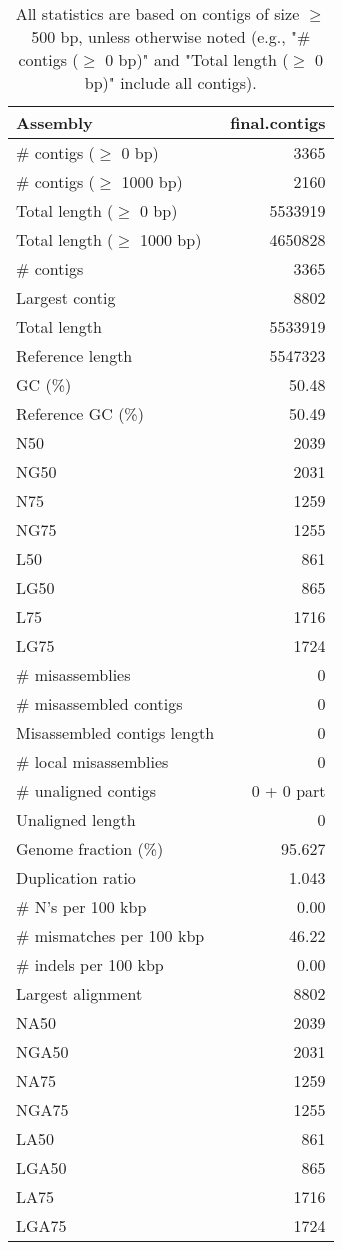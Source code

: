 \documentclass[12pt,a4paper]{article}
\begin{document}
\begin{table}[ht]
\begin{center}
\caption{All statistics are based on contigs of size $\geq$ 500 bp, unless otherwise noted (e.g., "\# contigs ($\geq$ 0 bp)" and "Total length ($\geq$ 0 bp)" include all contigs).}
\begin{tabular}{|l*{1}{|r}|}
\hline
Assembly & final.contigs \\ \hline
\# contigs ($\geq$ 0 bp) & 3365 \\ \hline
\# contigs ($\geq$ 1000 bp) & 2160 \\ \hline
Total length ($\geq$ 0 bp) & 5533919 \\ \hline
Total length ($\geq$ 1000 bp) & 4650828 \\ \hline
\# contigs & 3365 \\ \hline
Largest contig & 8802 \\ \hline
Total length & 5533919 \\ \hline
Reference length & 5547323 \\ \hline
GC (\%) & 50.48 \\ \hline
Reference GC (\%) & 50.49 \\ \hline
N50 & 2039 \\ \hline
NG50 & 2031 \\ \hline
N75 & 1259 \\ \hline
NG75 & 1255 \\ \hline
L50 & 861 \\ \hline
LG50 & 865 \\ \hline
L75 & 1716 \\ \hline
LG75 & 1724 \\ \hline
\# misassemblies & 0 \\ \hline
\# misassembled contigs & 0 \\ \hline
Misassembled contigs length & 0 \\ \hline
\# local misassemblies & 0 \\ \hline
\# unaligned contigs & 0 + 0 part \\ \hline
Unaligned length & 0 \\ \hline
Genome fraction (\%) & 95.627 \\ \hline
Duplication ratio & 1.043 \\ \hline
\# N's per 100 kbp & 0.00 \\ \hline
\# mismatches per 100 kbp & 46.22 \\ \hline
\# indels per 100 kbp & 0.00 \\ \hline
Largest alignment & 8802 \\ \hline
NA50 & 2039 \\ \hline
NGA50 & 2031 \\ \hline
NA75 & 1259 \\ \hline
NGA75 & 1255 \\ \hline
LA50 & 861 \\ \hline
LGA50 & 865 \\ \hline
LA75 & 1716 \\ \hline
LGA75 & 1724 \\ \hline
\end{tabular}
\end{center}
\end{table}
\end{document}
